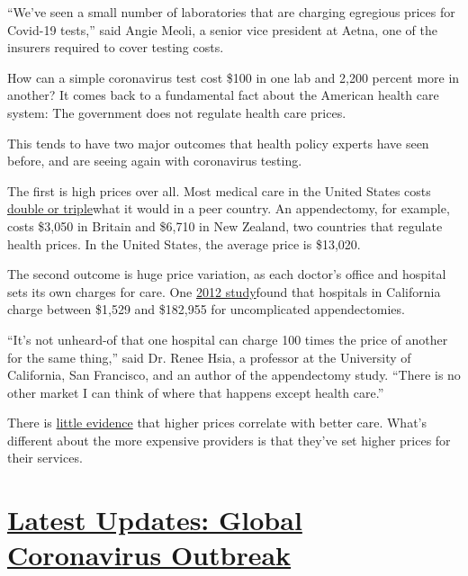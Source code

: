 ``We've seen a small number of laboratories that are charging egregious
prices for Covid-19 tests,'' said Angie Meoli, a senior vice president
at Aetna, one of the insurers required to cover testing costs.

How can a simple coronavirus test cost \$100 in one lab and 2,200
percent more in another? It comes back to a fundamental fact about the
American health care system: The government does not regulate health
care prices.

This tends to have two major outcomes that health policy experts have
seen before, and are seeing again with coronavirus testing.

The first is high prices over all. Most medical care in the United
States costs
\href{https://healthcostinstitute.org/hcci-research/international-comparisons-of-health-care-prices-2017-ifhp-survey}{double
or triple}what it would in a peer country. An appendectomy, for example,
costs \$3,050 in Britain and \$6,710 in New Zealand, two countries that
regulate health prices. In the United States, the average price is
\$13,020.

The second outcome is huge price variation, as each doctor's office and
hospital sets its own charges for care. One
\href{https://jamanetwork.com/journals/jamainternalmedicine/fullarticle/1151669}{2012
study}found that hospitals in California charge between \$1,529 and
\$182,955 for uncomplicated appendectomies.

``It's not unheard-of that one hospital can charge 100 times the price
of another for the same thing,'' said Dr. Renee Hsia, a professor at the
University of California, San Francisco, and an author of the
appendectomy study. ``There is no other market I can think of where that
happens except health care.''

There is
\href{https://journalofethics.ama-assn.org/article/complex-relationship-between-cost-and-quality-us-health-care/2014-02}{little
evidence} that higher prices correlate with better care. What's
different about the more expensive providers is that they've set higher
prices for their services.

\hypertarget{latest-updates-global-coronavirus-outbreak}{%
\section{\texorpdfstring{\href{https://www.nytimes.com/2020/08/04/world/coronavirus-cases.html?action=click\&pgtype=Article\&state=default\&region=MAIN_CONTENT_1\&context=storylines_live_updates}{Latest
Updates: Global Coronavirus
Outbreak}}{Latest Updates: Global Coronavirus Outbreak}}\label{latest-updates-global-coronavirus-outbreak}}

